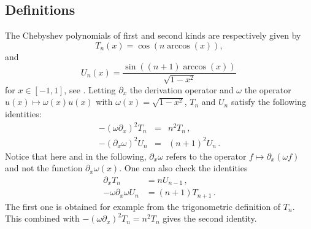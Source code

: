 \documentclass[a4paper]{article}
\begin{document}
\subsection{Definitions}

\label{sec:analyticalSetting}

The Chebyshev polynomials of first and second kinds are respectively given by
\[T_n(x) = \cos(n \arccos(x)),\]
and 
\[U_n(x) = \dfrac{\sin((n+1) \arccos(x))}{\sqrt{1 - x^2}}\,\]
for $x \in [-1,1]$, see \cite{mason2002chebyshev}. Letting $\partial_x$ the derivation operator and $\omega$ the operator $u(x) \mapsto \omega(x)u(x)$ with $\omega(x) = \sqrt{1 - x^2}$, $T_n$ and $U_n$ satisfy the following identities:
\begin{eqnarray}
	-(\omega\partial_x)^2 T_n &=& n^2T_n\,, \label{cheb1}\\
	-(\partial_x\omega)^2 U_n &=& (n+1)^2U_n\, .\label{cheb2}
\end{eqnarray}
Notice that here and in the following, $\partial_x\omega$ refers to the operator $f \mapsto \partial_x(\omega f)$ and not the function $\partial_x\omega(x)$. One can also check the identities 
\begin{align}
\partial_x T_n &= n U_{n-1}\,, \label{der1} \\
-\omega \partial_x \omega U_n &= (n+1)T_{n+1}\,. \label{der2}
\end{align}
The first one is obtained for example from the trigonometric definition of $T_n$. This combined with $-(\omega \partial_x)^2 T_n = n^2 T_n$ gives the second identity. 
\end{document}
